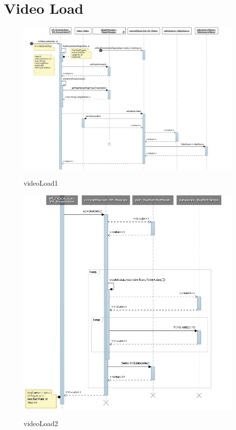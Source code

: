 \section{Video Load}
\begin{figure}[h]
\includegraphics[width=\linewidth]{bilder/Sequenzdiagramm/videoLoad1.png}
\label{}
\caption{videoLoad1}
\end{figure}

\begin{figure}[h]
\includegraphics[width=\linewidth]{bilder/Sequenzdiagramm/videoLoad2.png}
\label{}
\caption{videoLoad2}
\end{figure}


